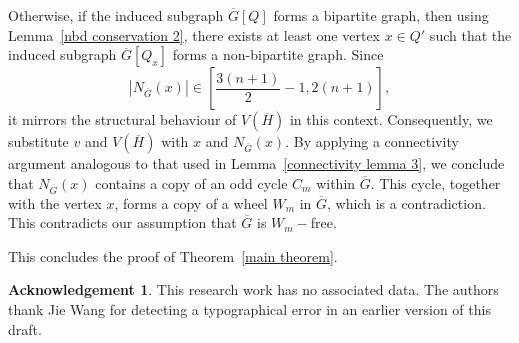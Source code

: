 \documentclass[reqno,10pt]{amsart}
\theoremstyle{definition}
\newtheorem*{acknowledgement}{Acknowledgement}
\begin{document}
Otherwise, if the induced subgraph $\overline{G}[Q]$ forms a bipartite graph, then using Lemma~\ref{nbd conservation 2}, there exists at least one vertex $x\in Q'$ such that the induced subgraph $\overline{G}[Q_{x}]$ forms a non-bipartite graph. Since 
\begin{equation*}
 |N_{\overline{G}}(x)|\in\left[\frac{3(n+1)}{2}-1,2(n+1)\right],   
\end{equation*}
it mirrors the structural behaviour of  $V(\overline{H})$ in this context. Consequently, we substitute $v$ and $V(\overline{H})$ with $x$ and $N_{\overline{G}}(x)$. By applying a connectivity argument analogous to that used in Lemma~\ref{connectivity lemma 3}, we conclude that $N_{\overline{G}}(x)$ contains a copy of an odd cycle $C_{m}$ within $\overline{G}$. This cycle, together with the vertex $x$, forms a copy of a wheel $W_{m}$ in $\overline{G}$, which is a contradiction. This contradicts our assumption that $\overline{G}$ is $W_{m}-$free.

This concludes the proof of Theorem~\ref{main theorem}.


\begin{acknowledgement}
This research work has no associated data. The authors thank Jie Wang for detecting a typographical error in an earlier version of this draft.     
\end{acknowledgement}
\end{document}
